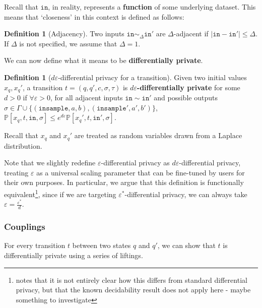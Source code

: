 \documentclass[12pt]{article}
\newcommand{\PP}{\mathbb{P}}
\theoremstyle{definition}
\newtheorem{defn}[thm]{Definition}
\begin{document}
Recall that $\texttt{in}$, in reality, represents a \textbf{function} of some underlying dataset. This means that `closeness' in this context is defined as follows:

\begin{defn}[Adjacency]
    Two inputs $\texttt{in}\sim_{\Delta} \texttt{in}'$ are $\Delta$-adjacent if $|\texttt{in}-\texttt{in}'|\leq \Delta$. If $\Delta$ is not specified, we assume that $\Delta = 1$. 
\end{defn}

We can now define what it means  to be \textbf{differentially private}.

\begin{defn}[$d\varepsilon$-differential privacy for a transition]
    Given two initial values $x_q, x_q'$, a transition $t=(q, q', c, \sigma, \tau)$ is \textbf{$d\varepsilon$-differentially private} for some $d>0$ if $\forall \varepsilon> 0$, for all adjacent inputs $\texttt{in}\sim \texttt{in}'$ and possible outputs $\sigma\in \Gamma\cup\{(\texttt{insample}, a, b), (\texttt{insample}', a', b')\}$, $\PP[x_q, t, \texttt{in}, \sigma]\leq e^{d\varepsilon}\PP[x_q', t, \texttt{in}', \sigma]$. 

    Recall that $x_q$ and $x_q'$ are treated as random variables drawn from a Laplace distribution. 
\end{defn}

Note that we slightly redefine $\varepsilon$-differential privacy as $d\varepsilon$-differential privacy, treating $\varepsilon$ as a universal scaling parameter that can be fine-tuned by users for their own purposes. 
In particular, we argue that this definition is functionally equivalent\footnote{\cite{chadhaLinearTimeDecidability2021} notes that it is not entirely clear how this differs from standard differential privacy, but that the known decidability result does not apply here - {\color{red} maybe something to investigate}}, since if we are targeting $\varepsilon^*$-differential privacy, we can always take $\varepsilon = \frac{\varepsilon^*}{d}$.

\subsubsection{Couplings}

For every transition $t$ between two states $q$ and $q'$, we can show that $t$ is differentially private using a series of liftings. 
\end{document}
